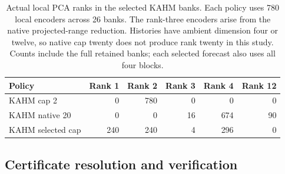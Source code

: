 \begin{table}[htbp]
\centering\small
\begin{tabular}{@{}lrrrrr@{}}
\toprule
Policy & Rank 1 & Rank 2 & Rank 3 & Rank 4 & Rank 12 \\
\midrule
KAHM cap 2 & 0 & 780 & 0 & 0 & 0 \\
KAHM native 20 & 0 & 0 & 16 & 674 & 90 \\
KAHM selected cap & 240 & 240 & 4 & 296 & 0 \\
\bottomrule
\end{tabular}
\caption{Actual local PCA ranks in the selected KAHM banks.
Each policy uses 780 local encoders across 26 banks. The rank-three
encoders arise from the native projected-range reduction. Histories
have ambient dimension four or twelve, so native cap twenty does not
produce rank twenty in this study. Counts include the full retained
banks; each selected forecast also uses all four blocks.}
\label{tab:dimension-policy-ranks}
\end{table}


\subsection{Certificate resolution and verification}

